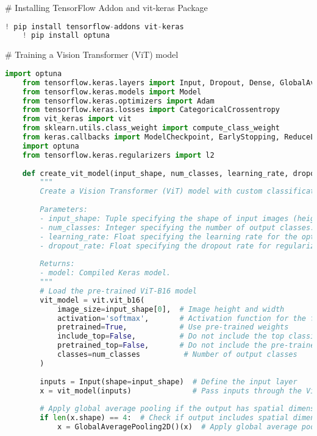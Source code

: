 # Installing TensorFlow Addon and vit-keras Package
\begin{lstlisting}[language=Python]
    ! pip install tensorflow-addons vit-keras
    ! pip install optuna
\end{lstlisting}

# Training a Vision Transformer (ViT) model
\begin{lstlisting}[language=Python]
    import optuna
    from tensorflow.keras.layers import Input, Dropout, Dense, GlobalAveragePooling2D
    from tensorflow.keras.models import Model
    from tensorflow.keras.optimizers import Adam
    from tensorflow.keras.losses import CategoricalCrossentropy
    from vit_keras import vit
    from sklearn.utils.class_weight import compute_class_weight
    from keras.callbacks import ModelCheckpoint, EarlyStopping, ReduceLROnPlateau
    import optuna
    from tensorflow.keras.regularizers import l2
    
    def create_vit_model(input_shape, num_classes, learning_rate, dropout_rate=0.3):
        """
        Create a Vision Transformer (ViT) model with custom classification layers.
    
        Parameters:
        - input_shape: Tuple specifying the shape of input images (height, width, channels).
        - num_classes: Integer specifying the number of output classes.
        - learning_rate: Float specifying the learning rate for the optimizer.
        - dropout_rate: Float specifying the dropout rate for regularization (default is 0.3).
    
        Returns:
        - model: Compiled Keras model.
        """
        # Load the pre-trained ViT-B16 model
        vit_model = vit.vit_b16(
            image_size=input_shape[0],  # Image height and width
            activation='softmax',       # Activation function for the final layer
            pretrained=True,            # Use pre-trained weights
            include_top=False,          # Do not include the top classification layer
            pretrained_top=False,       # Do not include the pre-trained top layer
            classes=num_classes          # Number of output classes
        )
    
        inputs = Input(shape=input_shape)  # Define the input layer
        x = vit_model(inputs)              # Pass inputs through the ViT model
    
        # Apply global average pooling if the output has spatial dimensions
        if len(x.shape) == 4:  # Check if output includes spatial dimensions
            x = GlobalAveragePooling2D()(x)  # Apply global average pooling
    

\end{lstlisting}
